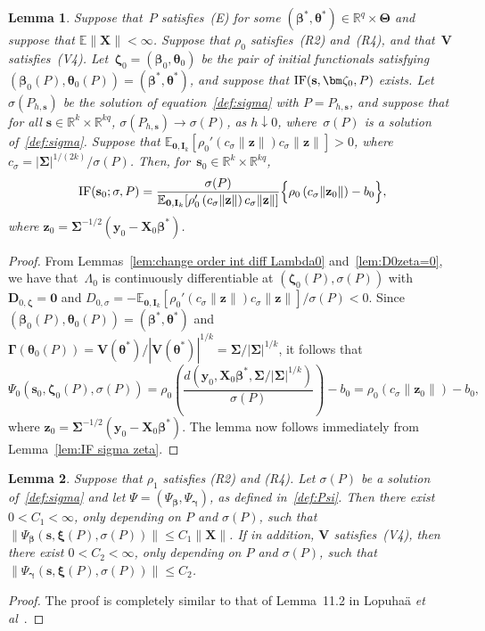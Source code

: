 \documentclass{article}
\numberwithin{equation}{section}
\theoremstyle{plain}
\newtheorem{lemma}{Lemma}
\newcommand{\R}{\mathbb{R}}
\newcommand{\bbeta}{\bm\beta}
\newcommand{\btheta}{\bm\theta}
\newcommand{\bxi}{\bm\xi}
\newcommand{\bgamma}{\bm\gamma}
\newcommand{\bSigma}{\mathbf{\Sigma}}
\newcommand{\bGamma}{\bm\Gamma}
\newcommand{\bTheta}{\bm\Theta}
\newcommand{\bzeta}{\bm\zeta}
\newcommand{\by}{\mathbf{y}}
\newcommand{\bs}{\mathbf{s}}
\newcommand{\bz}{\mathbf{z}}
\newcommand{\bX}{\mathbf{X}}
\newcommand{\bV}{\mathbf{V}}
\newcommand{\bI}{\mathbf{I}}
\newcommand{\bD}{\mathbf{D}}
\newcommand{\E}{\mathbb{E}}
\begin{document}
\begin{lemma}
\label{lem:IF sigma elliptical}
Suppose that~$P$ satisfies~(E) for some $(\bbeta^*,\btheta^*)\in\R^q\times\bTheta$
and suppose that $\E\|\bX\|<\infty$.
Suppose that $\rho_0$ satisfies~(R2) and~(R4), and that~$\bV$ satisfies~(V4).
Let~$\bzeta_0=(\bbeta_0,\btheta_0)$ be the pair of initial functionals
satisfying $(\bbeta_0(P),\btheta_0(P))=(\bbeta^*,\btheta^*)$,
and suppose that $\text{\rm IF}(\bs,\bzeta_0,P)$ exists.
Let~$\sigma(P_{h,\bs})$ be the solution of equation~\eqref{def:sigma} with $P=P_{h,\bs}$, 
and suppose that for all $\bs\in\R^k\times\R^{kq}$, $\sigma(P_{h,\bs})\to\sigma(P)$, as $h\downarrow0$,
where~$\sigma(P)$ is a solution of~\eqref{def:sigma}.
Suppose that 
$\E_{\mathbf{0},\bI_k}[
\rho_0'
\left(
c_\sigma\|\bz\|
\right)
c_\sigma\|\bz\|]
>0$,
where $c_\sigma=|\bSigma|^{1/(2k)}/\sigma(P)$.
Then, for~$\bs_0\in\R^k\times\R^{kq}$,
\[
\text{\rm IF}(\bs_0;\sigma,P)
=
\frac{\sigma(P)}{\E_{\mathbf{0},\bI_k}[
\rho_0'
\left(
c_\sigma\|\bz\|
\right)
c_\sigma\|\bz\|]}
\Big\{
\rho_0
\left(
c_\sigma\|\bz_0\|
\right)
-
b_0
\Big\},
\]
where $\bz_0=\bSigma^{-1/2}(\by_0-\bX_0\bbeta^*)$.
\end{lemma}
\begin{proof}
From Lemmas~\ref{lem:change order int diff Lambda0} and~\ref{lem:D0zeta=0}, 
we have that~$\Lambda_0$ is continuously differentiable 
at $(\bzeta_0(P),\sigma(P))$ with
$\bD_{0,\bzeta}=\mathbf{0}$ and
$D_{0,\sigma}=-\E_{\mathbf{0},\bI_k}[\rho_0'(c_\sigma\|\bz\|)c_\sigma\|\bz\|]/\sigma(P)<0$.
Since $(\bbeta_0(P),\btheta_0(P))=(\bbeta^*,\btheta^*)$ and 
$\bGamma(\btheta_0(P))=\bV(\btheta^*)/|\bV(\btheta^*)|^{1/k}=\bSigma/|\bSigma|^{1/k}$,
it follows that
\begin{equation}
\label{eq:Psi0 elliptical}
\Psi_0(\bs_0,\bzeta_0(P),\sigma(P))
=
\rho_0\left(
\frac{d(\by_0,\bX_0\bbeta^*,\bSigma/|\bSigma|^{1/k})}{\sigma(P)}
\right)-b_0
=
\rho_0
\left(
c_\sigma\|\bz_0\|
\right)
-
b_0,
\end{equation}
where $\bz_0=\bSigma^{-1/2}(\by_0-\bX_0\bbeta^*)$.
The lemma now follows immediately from Lemma~\ref{lem:IF sigma zeta}.
\end{proof}


\begin{lemma}
\label{lem:Psi bounded}
Suppose that $\rho_1$ satisfies (R2) and (R4).
Let $\sigma(P)$ be a solution of~\eqref{def:sigma} and let $\Psi=(\Psi_{\bbeta},\Psi_{\bgamma})$, as defined in~\eqref{def:Psi}.
Then there exist $0<C_1<\infty$, only depending on $P$ and $\sigma(P)$, such that
$\|\Psi_{\bbeta}(\bs,\bxi(P),\sigma(P))\|\leq C_1\|\bX\|$.
If in addition, $\bV$ satisfies~(V4), then there exist $0<C_2<\infty$, 
only depending on $P$ and $\sigma(P)$, such that~$\|\Psi_{\bgamma}(\bs,\bxi(P),\sigma(P))\|\leq C_2$.
\end{lemma}
\begin{proof}
The proof is completely similar to that of Lemma~11.2 in Lopuha\"a \emph{et al}~\cite{lopuhaa-gares-ruizgazen2023}.
\end{proof}
\end{document}
